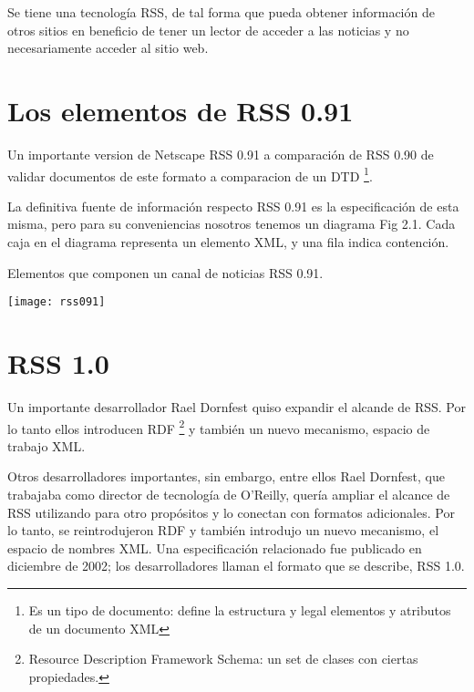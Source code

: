 Se tiene una tecnolog\'{i}a RSS, de tal forma que pueda obtener informaci\'{o}n de otros sitios en beneficio de
tener un lector de acceder a las noticias y no necesariamente acceder al sitio web.

\section{Los elementos de RSS 0.91}

Un importante version de Netscape RSS 0.91 a comparaci\'{o}n de RSS 0.90 de validar documentos de este formato
a comparacion de un DTD \footnote{Es un tipo de documento: define la estructura y legal elementos y atributos de un documento
XML}. 

La definitiva fuente de informaci\'{o}n respecto RSS 0.91 es la especificación de esta misma, pero para su 
conveniencias nosotros tenemos un diagrama Fig 2.1. Cada caja en el diagrama representa un elemento XML, 
y una fila indica contenci\'{o}n.\cite{johnson2006rss}

\begin{center}
	Elementos que componen un canal de noticias RSS 0.91.
\end{center}

\begin{minipage}{1.0\textwidth}
	\centering
	\texttt{[image: rss091]}

\end{minipage}


\section{RSS 1.0}

Un importante desarrollador Rael Dornfest quiso expandir el alcande de RSS. Por lo tanto ellos introducen
RDF \footnote{Resource Description Framework Schema: un set de clases con ciertas propiedades.} y tambi\'{e}n un nuevo mecanismo, espacio de trabajo XML.

Otros desarrolladores importantes, sin embargo, entre ellos Rael Dornfest, que trabajaba como director de
tecnolog\'{i}a de O'Reilly, quer\'{i}a ampliar el alcance de RSS utilizando para otro prop\'{o}sitos y lo
conectan con formatos adicionales. Por lo tanto, se reintrodujeron RDF y tambi\'{e}n introdujo un nuevo
mecanismo, el espacio de nombres XML. Una especificaci\'{o}n relacionado fue publicado en diciembre de 2002;
los desarrolladores llaman el formato que se describe, RSS 1.0.\cite{johnson2006rss}

